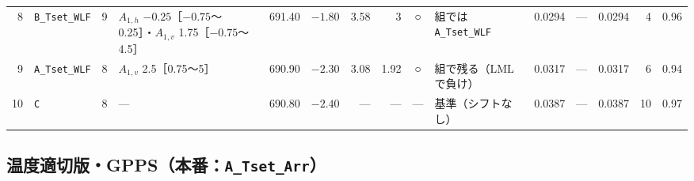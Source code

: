 \documentclass[paper=a4paper,landscape,fontsize=10pt,line_length=62zw,number_of_lines=34]{jlreq}
\begin{document}
\begin{table}[H]
\begin{tabular}{rlrp{12\zw}rrrrcp{8.5\zw}rrrrr}
8 & \texttt{B\_\allowbreak{}Tset\_\allowbreak{}WLF} & 9 & $A_{1,h}$ $-0.25$［$-0.75$〜0.25］・$A_{1,v}$ 1.75［$-0.75$〜4.5］ & 691.40 & $-1.80$ & 3.58 & 3 & ○ & 組では \texttt{A\_\allowbreak{}Tset\_\allowbreak{}WLF} & 0.0294 & --- & 0.0294 & 4 & 0.96 \\
9 & \texttt{A\_\allowbreak{}Tset\_\allowbreak{}WLF} & 8 & $A_{1,v}$ 2.5［0.75〜5］ & 690.90 & $-2.30$ & 3.08 & 1.92 & ○ & 組で残る（LML で負け） & 0.0317 & --- & 0.0317 & 6 & 0.94 \\
10 & \texttt{C} & 8 & --- & 690.80 & $-2.40$ & --- & --- & --- & 基準（シフトなし） & 0.0387 & --- & 0.0387 & 10 & 0.97 \\
\bottomrule
\end{tabular}
\end{table}

\subsection{温度適切版・GPPS（本番：\texttt{A\_\allowbreak{}Tset\_\allowbreak{}Arr}）}
\end{document}
